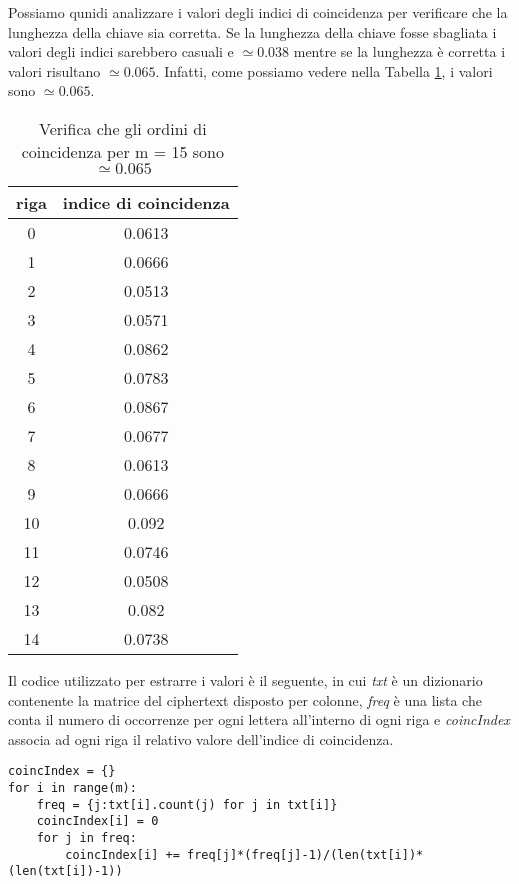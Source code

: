 \documentclass{article}
\begin{document}
Possiamo qunidi analizzare i valori degli indici di coincidenza per verificare che la lunghezza della chiave sia corretta. Se la lunghezza della chiave fosse sbagliata i valori degli indici sarebbero casuali e $\simeq 0.038$ mentre se la lunghezza è corretta i valori risultano $\simeq 0.065$. Infatti, come possiamo vedere nella Tabella \ref{tab:coinc}, i valori sono $\simeq 0.065$.
\begin{table}[h]
    \centering
    \begin{tabular}{c|c}
        riga&indice di coincidenza\\ \hline
        0&0.0613\\
        1&0.0666\\
        2&0.0513\\
        3&0.0571\\
        4&0.0862\\
        5&0.0783\\
        6&0.0867\\
        7&0.0677\\
        8&0.0613\\
        9&0.0666\\
        10&0.092\\
        11&0.0746\\
        12&0.0508\\
        13&0.082\\
        14&0.0738
    \end{tabular}
    \caption{Verifica che gli ordini di coincidenza per m = 15 sono $\simeq 0.065$}
    \label{tab:coinc}
\end{table}

Il codice utilizzato per estrarre i valori è il seguente, in cui \textit{txt} è un dizionario contenente la matrice del ciphertext disposto per colonne, \textit{freq} è una lista che conta il numero di occorrenze per ogni lettera all'interno di ogni riga e \textit{coincIndex} associa ad ogni riga il relativo valore dell'indice di coincidenza.
\begin{lstlisting}
coincIndex = {}
for i in range(m):
    freq = {j:txt[i].count(j) for j in txt[i]}
    coincIndex[i] = 0
    for j in freq:
        coincIndex[i] += freq[j]*(freq[j]-1)/(len(txt[i])*(len(txt[i])-1))
\end{lstlisting}
\end{document}
